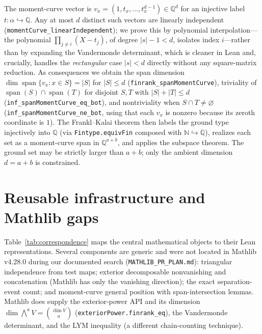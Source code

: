 \documentclass[11pt]{article}
\newcommand{\NN}{\mathbb{N}}
\newcommand{\QQ}{\mathbb{Q}}
\newcommand{\bind}[2]{\binom{#1}{#2}}
\newcommand{\wedgep}[1]{\textstyle\bigwedge^{#1}}
\begin{document}
The moment-curve vector is $v_x=(1,t_x,\dots,t_x^{d-1})\in\QQ^d$ for an injective label
$t:\alpha\hookrightarrow\QQ$. Any at most $d$ distinct such vectors are linearly
independent (\lstinline{momentCurve_linearIndependent}); we prove this by polynomial
interpolation---the polynomial $\prod_{j\neq i}(X-t_j)$, of degree $|s|-1<d$, isolates
index $i$---rather than by expanding the Vandermonde determinant, which is cleaner in
Lean and, crucially, handles the \emph{rectangular} case $|s|<d$ directly without any
square-matrix reduction. As consequences we obtain the span dimension
$\dim\operatorname{span}\{v_x:x\in S\}=|S|$ for $|S|\le d$
(\lstinline{finrank_spanMomentCurve}), triviality of
$\operatorname{span}(S)\cap\operatorname{span}(T)$ for disjoint $S,T$ with $|S|+|T|\le d$
(\lstinline{inf_spanMomentCurve_eq_bot}), and nontriviality when $S\cap
T\neq\varnothing$ (\lstinline{inf_spanMomentCurve_ne_bot}, using that each $v_x$ is
nonzero because its zeroth coordinate is $1$). The Frankl--Kalai theorem then labels the
ground type injectively into $\QQ$ (via \lstinline{Fintype.equivFin} composed with
$\NN\hookrightarrow\QQ$), realizes each set as a moment-curve span in $\QQ^{a+b}$, and
applies the subspace theorem. The ground set may be strictly larger than $a+b$; only the
ambient dimension $d=a+b$ is constrained.

\section{Reusable infrastructure and Mathlib gaps}\label{sec:reuse}

Table~\ref{tab:correspondence} maps the central mathematical objects to their Lean
representations. Several components are generic and were not located in Mathlib v4.28.0 during our documented search
(\texttt{MATHLIB\_PR\_PLAN.md}): triangular independence from test maps; exterior
decomposable nonvanishing and concatenation (Mathlib has only the vanishing direction);
the exact separation-event count; and moment-curve general position with
span-intersection lemmas. Mathlib does supply the exterior-power API and its dimension
$\dim\wedgep{a}V=\bind{\dim V}{a}$ (\lstinline{exteriorPower.finrank_eq}), the
Vandermonde determinant, and the LYM inequality (a different chain-counting technique).
\end{document}
